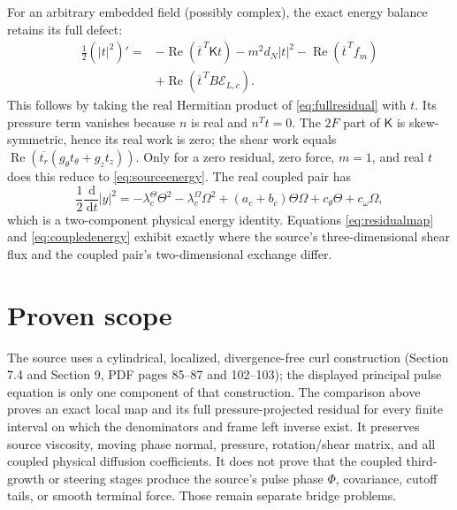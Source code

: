 \documentclass[11pt]{article}
\newcommand{\dd}{\,\mathrm d}
\begin{document}
For an arbitrary embedded field (possibly complex), the exact energy balance
retains its full defect:
\begin{equation}
 \begin{split}
 \frac12(|t|^2)'={}&-\operatorname{Re}(\overline t^{\,T}\mathsf Kt)
 -m^2d_N|t|^2-\operatorname{Re}(\overline t^{\,T}f_m)\\
 &+\operatorname{Re}(\overline t^{\,T}B\mathcal E_{L,c}).
 \end{split}
\end{equation}
This follows by taking the real Hermitian product of
\eqref{eq:fullresidual} with $t$. Its pressure term vanishes because $n$ is
real and $n^Tt=0$. The $2F$ part of $\mathsf K$ is skew-symmetric, hence
its real work is zero; the shear work equals
$\operatorname{Re}(\overline{t_r}(g_\theta t_\theta+g_z t_z))$.
Only for a zero residual, zero force, $m=1$, and real $t$ does this reduce
to \eqref{eq:sourceenergy}. The real coupled pair has
\begin{equation}
 \frac12\frac{\dd}{\dd t}|y|^2
 =-\lambda_c^\Theta\Theta^2-\lambda_c^\Omega\Omega^2
 +(a_c+b_c)\Theta\Omega+c_\theta\Theta+c_\omega\Omega,
 \label{eq:coupledenergy}
\end{equation}
which is a two-component physical energy identity.  Equations
\eqref{eq:residualmap} and \eqref{eq:coupledenergy} exhibit exactly where the
source's three-dimensional shear flux and the coupled pair's two-dimensional
exchange differ.

\section{Proven scope}
The source uses a cylindrical, localized, divergence-free curl construction
(Section 7.4 and Section 9, PDF pages 85--87 and 102--103); the displayed
principal pulse equation is only one component of that construction.  The
comparison above proves an exact local map and its full pressure-projected
residual for every finite interval on which the denominators and frame left
inverse exist.  It preserves source viscosity, moving phase normal, pressure,
rotation/shear matrix, and all coupled physical diffusion coefficients.  It does
not prove that the coupled third-growth or steering stages produce the source's
pulse phase $\Phi$, covariance, cutoff tails, or smooth terminal force.  Those
remain separate bridge problems.
\end{document}

